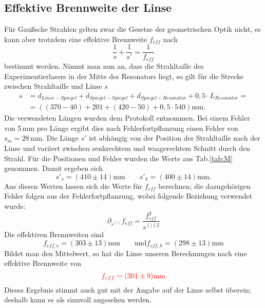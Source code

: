 \subsection{Effektive Brennweite der Linse}
\label{subs:f}
Für Gaußsche Strahlen gelten zwar die Gesetze der geometrischen Optik nicht, es kann aber trotzdem eine effektive Brennweite $f_{eff}$ nach 
\begin{equation*}
    \frac{1}{s} + \frac{1}{s'} = \frac{1}{f_{eff}}
\end{equation*}
bestimmt werden. Nimmt man nun an, dass die Strahltaille des Experimentierlasers in der Mitte des Resonators liegt, so gilt für die Strecke zwischen Strahltaille und 
Linse $s$
\begin{align*}
    s &= d_{Linse-Spiegel} + d_{Spiegel-Spiegel} + d_{Spiegel-Resonator} + 0,5 \cdot L_{Resonator} = \\
    &= ((370 - 40) + 201 + (420-50) + 0,5 \cdot 540)\mathrm{mm}.
\end{align*}
Die verwendeten Längen wurden dem Protokoll entnommen. Bei einem Fehler von 5\,mm pro Länge ergibt dies nach Fehlerfortpflanzung einen Fehler von $s_m = 28$\,mm. 
Die Länge $s'$ ist abhängig von der Position der Strahltaille nach der Linse und variiert zwischen senkrechtem und waagerechtem Schnitt durch den Strahl. Für die 
Positionen und Fehler wurden die Werte aus Tab.\ref{tab:M} genommen. Damit ergeben sich
\begin{equation*}
    s'_v = (410 \pm 14)\mathrm{mm} \qquad s'_h = (400 \pm 14)\mathrm{mm}.
\end{equation*}
Aus diesen Werten lassen sich die Werte für $f_{eff}$ berechnen; die dazugehörigen Fehler folgen aus der Fehlerfortpflanzung, wobei folgende Beziehung verwendet wurde:
\begin{equation*}
    \partial_{s^{(|)}}f_{eff} = \frac{f_{eff}^2}{s^{(|)2}}
\end{equation*}
Die effektiven Brennweiten sind
\begin{equation*}
    f_{eff,v} = (303 \pm 13)\mathrm{mm}\qquad\mathrm{und }f_{eff,h}=(298 \pm 13)\mathrm{mm}
\end{equation*}
Bildet man den Mittelwert, so hat die Linse unseren Berechnungen nach eine effektive Brennweite von
\begin{equation*}
    \textcolor{red}{f_{eff} = (301 \pm 9) \mathrm{mm}}
\end{equation*}
Dieses Ergebnis stimmt auch gut mit der Angabe auf der Linse selbst überein; deshalb kann es als sinnvoll angesehen werden.


